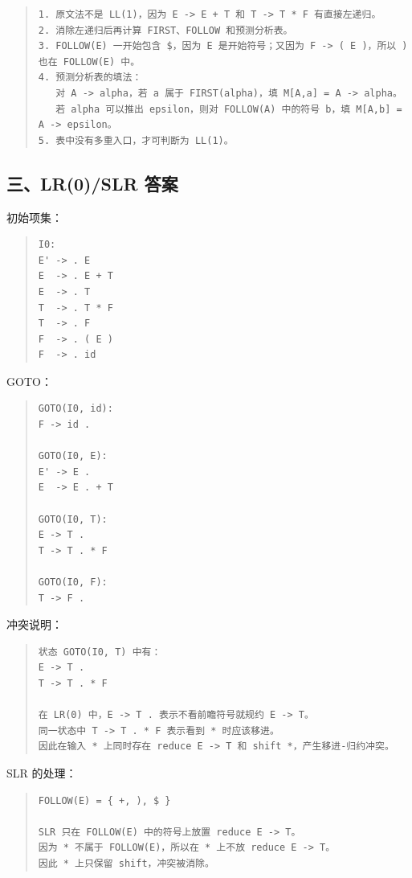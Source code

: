 \documentclass[UTF8,zihao=-4]{ctexart}
\begin{document}
\begin{quote}
\footnotesize
\begin{verbatim}
1. 原文法不是 LL(1)，因为 E -> E + T 和 T -> T * F 有直接左递归。
2. 消除左递归后再计算 FIRST、FOLLOW 和预测分析表。
3. FOLLOW(E) 一开始包含 $，因为 E 是开始符号；又因为 F -> ( E )，所以 ) 也在 FOLLOW(E) 中。
4. 预测分析表的填法：
   对 A -> alpha，若 a 属于 FIRST(alpha)，填 M[A,a] = A -> alpha。
   若 alpha 可以推出 epsilon，则对 FOLLOW(A) 中的符号 b，填 M[A,b] = A -> epsilon。
5. 表中没有多重入口，才可判断为 LL(1)。
\end{verbatim}
\end{quote}

\subsection*{三、LR(0)/SLR 答案}

初始项集：

\begin{quote}
\footnotesize
\begin{verbatim}
I0:
E' -> . E
E  -> . E + T
E  -> . T
T  -> . T * F
T  -> . F
F  -> . ( E )
F  -> . id
\end{verbatim}
\end{quote}

GOTO：

\begin{quote}
\footnotesize
\begin{verbatim}
GOTO(I0, id):
F -> id .

GOTO(I0, E):
E' -> E .
E  -> E . + T

GOTO(I0, T):
E -> T .
T -> T . * F

GOTO(I0, F):
T -> F .
\end{verbatim}
\end{quote}

冲突说明：

\begin{quote}
\footnotesize
\begin{verbatim}
状态 GOTO(I0, T) 中有：
E -> T .
T -> T . * F

在 LR(0) 中，E -> T . 表示不看前瞻符号就规约 E -> T。
同一状态中 T -> T . * F 表示看到 * 时应该移进。
因此在输入 * 上同时存在 reduce E -> T 和 shift *，产生移进-归约冲突。
\end{verbatim}
\end{quote}

SLR 的处理：

\begin{quote}
\footnotesize
\begin{verbatim}
FOLLOW(E) = { +, ), $ }

SLR 只在 FOLLOW(E) 中的符号上放置 reduce E -> T。
因为 * 不属于 FOLLOW(E)，所以在 * 上不放 reduce E -> T。
因此 * 上只保留 shift，冲突被消除。
\end{verbatim}
\end{quote}
\end{document}
